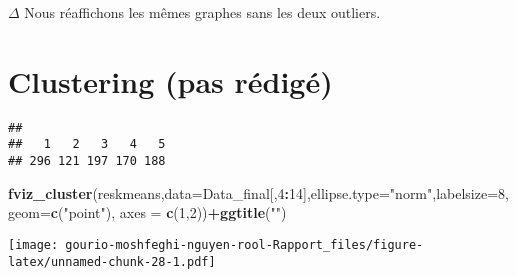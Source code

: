 \documentclass[
]{article}
\newenvironment{Shaded}{\begin{snugshade}}{\end{snugshade}}
\newcommand{\AttributeTok}[1]{\textcolor[rgb]{0.13,0.29,0.53}{#1}}
\newcommand{\DecValTok}[1]{\textcolor[rgb]{0.00,0.00,0.81}{#1}}
\newcommand{\FunctionTok}[1]{\textcolor[rgb]{0.13,0.29,0.53}{\textbf{#1}}}
\newcommand{\NormalTok}[1]{#1}
\newcommand{\OtherTok}[1]{\textcolor[rgb]{0.56,0.35,0.01}{#1}}
\newcommand{\SpecialCharTok}[1]{\textcolor[rgb]{0.81,0.36,0.00}{\textbf{#1}}}
\newcommand{\StringTok}[1]{\textcolor[rgb]{0.31,0.60,0.02}{#1}}
\begin{document}
\(\Delta\) Nous réaffichons les mêmes graphes sans les deux outliers.

\hypertarget{clustering-pas-ruxe9diguxe9}{%
\section{Clustering (pas rédigé)}\label{clustering-pas-ruxe9diguxe9}}

\begin{Shaded}
\end{Shaded}

\begin{verbatim}
## 
##   1   2   3   4   5 
## 296 121 197 170 188
\end{verbatim}

\begin{Shaded}
\begin{Highlighting}[]
\FunctionTok{fviz\_cluster}\NormalTok{(reskmeans,}\AttributeTok{data=}\NormalTok{Data\_final[,}\DecValTok{4}\SpecialCharTok{:}\DecValTok{14}\NormalTok{],}\AttributeTok{ellipse.type=}\StringTok{"norm"}\NormalTok{,}\AttributeTok{labelsize=}\DecValTok{8}\NormalTok{,}\AttributeTok{geom=}\FunctionTok{c}\NormalTok{(}\StringTok{"point"}\NormalTok{), }\AttributeTok{axes =} \FunctionTok{c}\NormalTok{(}\DecValTok{1}\NormalTok{,}\DecValTok{2}\NormalTok{))}\SpecialCharTok{+}\FunctionTok{ggtitle}\NormalTok{(}\StringTok{""}\NormalTok{)}
\end{Highlighting}
\end{Shaded}

\texttt{[image: gourio-moshfeghi-nguyen-rool-Rapport\_files/figure-latex/unnamed-chunk-28-1.pdf]}

\begin{Shaded}
\end{Shaded}
\end{document}
